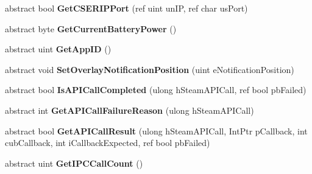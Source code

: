 \begin{DoxyCompactItemize}
\item 
\mbox{\label{class_valve_1_1_steamworks_1_1_i_steam_utils_af176d07f593cf3279ce8f546d0726e95}} 
abstract bool {\bfseries Get\+C\+S\+E\+R\+I\+P\+Port} (ref uint un\+IP, ref char us\+Port)
\item 
\mbox{\label{class_valve_1_1_steamworks_1_1_i_steam_utils_aa4592fdb0ba3d483f8e83d9bc976964b}} 
abstract byte {\bfseries Get\+Current\+Battery\+Power} ()
\item 
\mbox{\label{class_valve_1_1_steamworks_1_1_i_steam_utils_a6d56e5412e76a8c26dcbccc9b527c0a4}} 
abstract uint {\bfseries Get\+App\+ID} ()
\item 
\mbox{\label{class_valve_1_1_steamworks_1_1_i_steam_utils_aed9d076878fc4d52b3c444fe1162fd38}} 
abstract void {\bfseries Set\+Overlay\+Notification\+Position} (uint e\+Notification\+Position)
\item 
\mbox{\label{class_valve_1_1_steamworks_1_1_i_steam_utils_aa2c69fd8ab2b8a01a418c095380ff183}} 
abstract bool {\bfseries Is\+A\+P\+I\+Call\+Completed} (ulong h\+Steam\+A\+P\+I\+Call, ref bool pb\+Failed)
\item 
\mbox{\label{class_valve_1_1_steamworks_1_1_i_steam_utils_aa7c77c944c337188fd17b9dc8ed0602b}} 
abstract int {\bfseries Get\+A\+P\+I\+Call\+Failure\+Reason} (ulong h\+Steam\+A\+P\+I\+Call)
\item 
\mbox{\label{class_valve_1_1_steamworks_1_1_i_steam_utils_adac9f9942863d932a078e8b1171ba4b2}} 
abstract bool {\bfseries Get\+A\+P\+I\+Call\+Result} (ulong h\+Steam\+A\+P\+I\+Call, Int\+Ptr p\+Callback, int cub\+Callback, int i\+Callback\+Expected, ref bool pb\+Failed)
\item 
\mbox{\label{class_valve_1_1_steamworks_1_1_i_steam_utils_a349cf5610843e0a7ee6c8e95029c71da}} 
abstract uint {\bfseries Get\+I\+P\+C\+Call\+Count} ()
\item 

\end{DoxyCompactItemize}
